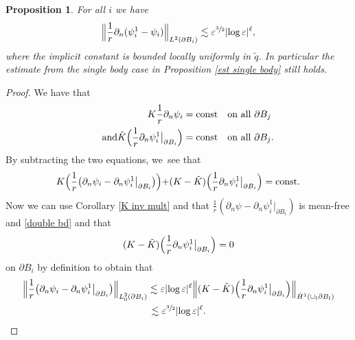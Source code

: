 \documentclass[10pt]{amsart}
\let\epsilon\varepsilon
\newcommand{\const}{\textup{const}}
\newtheorem{proposition}[theorem]{Proposition}
\theoremstyle{definition}
\newcommand\Bnorm[1]{\Bigl\lVert #1\Bigr\rVert}
\newcommand\eq{=}
\let\de\partial
\let\eps\epsilon
\begin{document}
\begin{proposition}\label{comp mult}
For all $i$ we have
\begin{align*}
\Bnorm{\frac{1}{r}\de_n(\psi_i^1-\psi_i)}_{L^2(\de B_i)}\lesssim \eps^{\sfrac{3}{2}}|{\log\eps}|^\ell,
\end{align*}
where the implicit constant is bounded locally uniformly in $\tilde{q}$.
In particular the estimate from the single body case in Proposition \ref{est single body} still holds.
\end{proposition}
\begin{proof}
We have that
\begin{align*}
K\frac{1}{r}\de_n\psi_i&\eq \const \quad\text{on all $\de B_j$}
\\
\tag*{and}
\tilde{K}\Bigl(\frac{1}{r}\de_n\psi_i^1\big|_{\de B_i}\Bigr)&\eq \const \quad\text{on all $\de B_j$}.
\end{align*}
By subtracting the two equations, we~see that
\begin{align*}
K\Bigl(\frac{1}{r}\bigl(\de_n\psi_i-\de_n\psi_i^1\big|_{\de B_i}\bigr)\Bigl)+(K-\tilde{K})\Bigl(\frac{1}{r}\de_n\psi_i^1\big|_{\de B_i}\Bigr)\eq \const.
\end{align*}
Now we can use Corollary \ref{K inv mult} and that $\frac{1}{r}(\de_n\psi-\de_n\psi_i^1\big|_{\de B_i})$ is mean-free and \eqref{double bd} and that
\begin{align*}(K-\tilde{K}) \Bigl(\frac{1}{r}\de_n\psi_i^1\big|_{\de B_i} \Bigr)\eq 0
\end{align*}
on $\de B_i$ by definition to obtain that
\begin{multline*}
\Bnorm{\frac{1}{r}\bigl(\de_n\psi_i-\de_n\psi_i^1\big|_{\de B_i}\bigr)}_{L_0^2(\de B_i)}\lesssim \eps|{\log\eps}|^\ell\Bnorm{(K-\tilde{K}) \Bigl(\frac{1}{r}\de_n\psi_i^1\big|_{\de B_i}\Bigr)}_{\dot{H}^1(\cup_l\de B_l)}\\
\lesssim \eps^{\sfrac{3}{2}}|{\log\eps}|^\ell.\qedhere
\end{multline*}
\end{proof}
\end{document}
